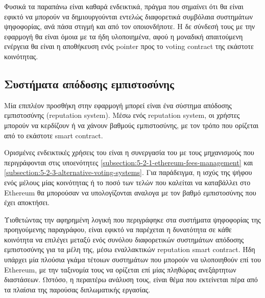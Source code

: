 Φυσικά τα παραπάνω είναι καθαρά ενδεικτικά, πράγμα που σημαίνει ότι θα είναι εφικτό να μπορούν να δημιουργούνται εντελώς διαφορετικά συμβόλαια συστημάτων ψηφοφορίας, ανά πάσα στιγμή και από τον οποιονδήποτε. Η δε σύνδεσή τους με την εφαρμογή θα είναι όμοια με τα ήδη υλοποιημένα, αφού η μοναδική απαιτούμενη ενέργεια θα είναι η αποθήκευση ενός pointer προς το voting contract της εκάστοτε κοινότητας.

\subsection{Συστήματα απόδοσης εμπιστοσύνης}\label{subsection:5-2-4-reputation-systems}

Μία επιπλέον προσθήκη στην εφαρμογή μπορεί είναι ένα σύστημα απόδοσης εμπιστοσύνης (reputation system). Μέσω ενός reputation system, οι χρήστες μπορούν να κερδίζουν ή να χάνουν βαθμούς εμπιστοσύνης, με τον τρόπο που ορίζεται από το εκάστοτε smart contract.

Ορισμένες ενδεικτικές χρήσεις του είναι η συνεργασία του με τους μηχανισμούς που περιγράφονται στις υποενότητες \ref{subsection:5-2-1-ethereum-fees-management} και \ref{subsection:5-2-3-alternative-voting-systems}. Για παράδειγμα, η ισχύς της ψήφου ενός μέλους μίας κοινότητας ή το ποσό των τελών που καλείται να καταβάλλει στο Ethereum θα μπορούσαν να υπολογίζονται αναλογα με τον βαθμό εμπιστοσύνης που έχει αποκτήσει.

Υιοθετώντας την αφηρημένη λογική που περιγράφηκε στα συστήματα ψηφοφορίας της προηγούμενης παραγράφου, είναι εφικτό να παρέχεται η δυνατότητα σε κάθε κοινότητα να επιλέγει μεταξύ ενός συνόλου διαφορετικών συστημάτων απόδοσης εμπιστοσύνης για τα μέλη της, μέσω εναλλακτικών reputation smart contract. Ήδη υπάρχει μία πλούσια γκάμα τέτοιων συστημάτων που μπορούν να υλοποιηθούν επί του Ethereum, με την ταξινομία τους να ορίζεται επί μίας πληθώρας ανεξάρτητων διαστάσεων.\cite{5.2-taxonomy-of-reputation-systems} Ωστόσο, η περαιτέρω ανάλυση τους, είναι θέμα που εκτείνεται πέρα από τα πλαίσια της παρούσας διπλωματικής εργασίας.
